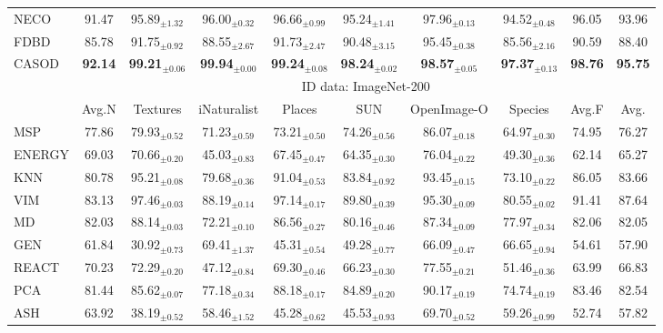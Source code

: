 \begin{table}[t!]
{\begin{tabular}{|l|c|cccccc|c|c|}
NECO   &  91.47 & 95.89$_{\pm 1.32}$ & 96.00$_{\pm 0.32}$ & 96.66$_{\pm 0.99}$ & 95.24$_{\pm 1.41}$ & 97.96$_{\pm 0.13}$ & 94.52$_{\pm 0.48}$ & 96.05 & 93.96 \\
FDBD   & 85.78 & 91.75$_{\pm 0.92}$ & 88.55$_{\pm 2.67}$ & 91.73$_{\pm 2.47}$ & 90.48$_{\pm 3.15}$ & 95.45$_{\pm 0.38}$ & 85.56$_{\pm 2.16}$ & 90.59 & 88.40 \\ \hline
CASOD  & \textbf{92.14} & \textbf{99.21}$_{\pm 0.06}$ & \textbf{99.94}$_{\pm 0.00}$ & \textbf{99.24}$_{\pm 0.08}$ & \textbf{98.24}$_{\pm 0.02}$ & \textbf{98.57}$_{\pm 0.05}$ & \textbf{97.37}$_{\pm 0.13}$ & \textbf{98.76} & \textbf{95.75} \\ \hline
			\multirow{2}{*}{} &  \multicolumn{9}{c|}{ID data: ImageNet-200}  \\ \cline{2-10}
			&  Avg.N & Textures  & iNaturalist  & Places  & SUN & OpenImage-O & Species & Avg.F & Avg. \\ \hline
            MSP    & 77.86 & 79.93$_{\pm 0.52}$ & 71.23$_{\pm 0.59}$ & 73.21$_{\pm 0.50}$ & 74.26$_{\pm 0.56}$ & 86.07$_{\pm 0.18}$ & 64.97$_{\pm 0.30}$ & 74.95 & 76.27 \\
ENERGY & 69.03 & 70.66$_{\pm 0.20}$ & 45.03$_{\pm 0.83}$ & 67.45$_{\pm 0.47}$ & 64.35$_{\pm 0.30}$ & 76.04$_{\pm 0.22}$ & 49.30$_{\pm 0.36}$ & 62.14 & 65.27 \\
KNN    &  80.78 & 95.21$_{\pm 0.08}$ & 79.68$_{\pm 0.36}$ & 91.04$_{\pm 0.53}$ & 83.84$_{\pm 0.92}$ & 93.45$_{\pm 0.15}$ & 73.10$_{\pm 0.22}$ & 86.05 & 83.66 \\
VIM    &  83.13 & 97.46$_{\pm 0.03}$ & 88.19$_{\pm 0.14}$ & 97.14$_{\pm 0.17}$ & 89.80$_{\pm 0.39}$ & 95.30$_{\pm 0.09}$ & 80.55$_{\pm 0.02}$ & 91.41 & 87.64 \\
MD     &  82.03 & 88.14$_{\pm 0.03}$ & 72.21$_{\pm 0.10}$ & 86.56$_{\pm 0.27}$ & 80.16$_{\pm 0.46}$ & 87.34$_{\pm 0.09}$ & 77.97$_{\pm 0.34}$ & 82.06 & 82.05 \\
GEN    &  61.84 & 30.92$_{\pm 0.73}$ & 69.41$_{\pm 1.37}$ & 45.31$_{\pm 0.54}$ & 49.28$_{\pm 0.77}$ & 66.09$_{\pm 0.47}$ & 66.65$_{\pm 0.94}$ & 54.61 & 57.90 \\
REACT  & 70.23 & 72.29$_{\pm 0.20}$ & 47.12$_{\pm 0.84}$ & 69.30$_{\pm 0.46}$ & 66.23$_{\pm 0.30}$ & 77.55$_{\pm 0.21}$ & 51.46$_{\pm 0.36}$ & 63.99 & 66.83 \\
PCA    & 81.44 & 85.62$_{\pm 0.07}$ & 77.18$_{\pm 0.34}$ & 88.18$_{\pm 0.17}$ & 84.89$_{\pm 0.20}$ & 90.17$_{\pm 0.19}$ & 74.74$_{\pm 0.19}$ & 83.46 & 82.54 \\
ASH    & 63.92 & 38.19$_{\pm 0.52}$ & 58.46$_{\pm 1.52}$ & 45.28$_{\pm 0.62}$ & 45.53$_{\pm 0.93}$ & 69.70$_{\pm 0.52}$ & 59.26$_{\pm 0.99}$ & 52.74 & 57.82 \\

\end{tabular}}
\end{table}
